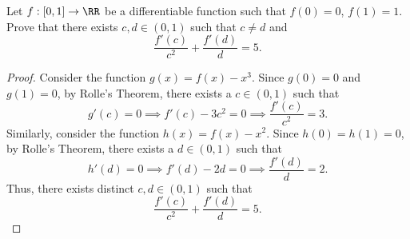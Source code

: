 \begin{problem}
    Let $f: [0,1] \to \RR$ be a differentiable function such that $f(0) = 0$, $f(1) = 1$. Prove that there exists $c, d \in (0, 1)$ such that $c \neq d$ and \[\frac{f'(c)}{c^2} + \frac{f'(d)}{d} = 5.\]
\end{problem}
\begin{proof}
    Consider the function $g(x) = f(x) - x^3$. Since $g(0) = 0$ and $g(1) = 0$, by Rolle's Theorem, there exists a $c \in (0, 1)$ such that \[g'(c) = 0 \implies f'(c) - 3c^2 = 0 \implies \frac{f'(c)}{c^2} = 3.\] Similarly, consider the function $h(x) = f(x) - x^2$. Since $h(0) = h(1) = 0$, by Rolle's Theorem, there exists a $d \in (0, 1)$ such that \[h'(d) = 0 \implies f'(d) - 2d = 0 \implies \frac{f'(d)}{d} = 2.\] Thus, there exists distinct $c, d \in (0, 1)$ such that \[\frac{f'(c)}{c^2} + \frac{f'(d)}{d} = 5.\]
\end{proof}